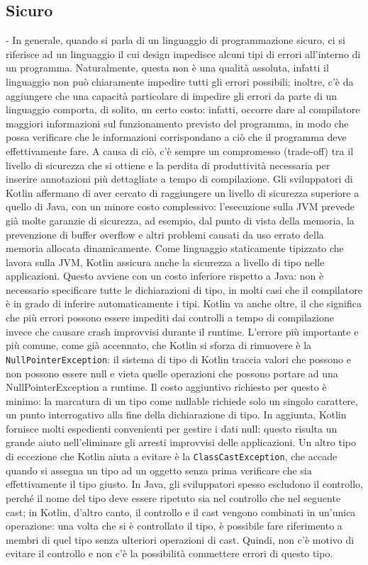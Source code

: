 \subsection{Sicuro}
- In generale, quando si parla di un linguaggio di programmazione sicuro, ci si riferisce ad un linguaggio il cui design impedisce alcuni tipi di errori all’interno di un programma. Naturalmente, questa non è una qualità assoluta, infatti il linguaggio non può chiaramente impedire tutti gli errori possibili; inoltre, c’è da aggiungere che una capacità particolare di impedire gli errori da parte di un linguaggio comporta, di solito, un certo costo: infatti, occorre dare al compilatore maggiori informazioni sul funzionamento previsto del programma, in modo che possa verificare che le informazioni corrispondano a ciò che il programma deve effettivamente fare. A causa di ciò, c'è sempre un compromesso (trade-off) tra il livello di sicurezza che si ottiene e la perdita di produttività necessaria per inserire annotazioni più dettagliate a tempo di compilazione. Gli sviluppatori di Kotlin affermano di aver cercato di raggiungere un livello di sicurezza superiore a quello di Java, con un minore costo complessivo: l'esecuzione sulla JVM prevede già molte garanzie di sicurezza, ad esempio, dal punto di vista della memoria, la prevenzione di buffer overflow e altri problemi causati da uso errato della memoria allocata dinamicamente. Come linguaggio staticamente tipizzato che lavora sulla JVM, Kotlin assicura anche la sicurezza a livello di tipo nelle applicazioni. Questo avviene con un costo inferiore rispetto a Java: non è necessario specificare tutte le dichiarazioni di tipo, in molti casi che il compilatore è in grado di inferire automaticamente i tipi. Kotlin va anche oltre, il che significa che più errori possono essere impediti dai controlli a tempo di compilazione invece che causare crash improvvisi durante il runtime. L’errore più importante e più comune, come già accennato, che Kotlin si sforza di rimuovere è la \texttt{NullPointerException}: il sistema di tipo di Kotlin traccia valori che possono e non possono essere null e vieta quelle operazioni che possono portare ad una NullPointerException a runtime. Il costo aggiuntivo richiesto per questo è minimo: la marcatura di un tipo come nullable richiede solo un singolo carattere, un punto interrogativo alla fine della dichiarazione di tipo. In aggiunta, Kotlin fornisce molti espedienti convenienti per gestire i dati null: questo risulta un grande aiuto nell'eliminare gli arresti improvvisi delle applicazioni. Un altro tipo di eccezione che Kotlin aiuta a evitare è la \texttt{ClassCastException}, che accade quando si assegna un tipo ad un oggetto senza prima verificare che sia effettivamente il tipo giusto. In Java, gli sviluppatori spesso escludono il controllo, perché il nome del tipo deve essere ripetuto sia nel controllo che nel seguente cast; in Kotlin, d'altro canto, il controllo e il cast vengono combinati in un'unica operazione: una volta che si è controllato il tipo, è possibile fare riferimento a membri di quel tipo senza ulteriori operazioni di cast. Quindi, non c'è motivo di evitare il controllo e non c’è la possibilità commettere errori di questo tipo.\\
